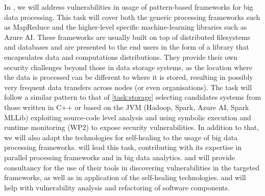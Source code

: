 \begin{Workpackage}{\thewpno}
 \begin{Task}
 \TaskResults{%
 \ref{del:bigdata1},
 \ref{del:bigdata2},
 \ref{del:bigdata3}
 }
 \TaskHeader{}
 In \theTask, we will address vulnerabilities in usage of pattern-based frameworks for big data processing. This task will cover both the generic processing frameworks such as MapReduce and the higher-level specific machine-learning libraries such as Azure AI. These frameworks are usually built on top of distributed filesystems and databases and are presented to the end users in the form of a library that encapsulates data and computations distributions. They provide their own security challenges beyond those in data storage systems, as the location where the data is processed can be different to where it is stored, resulting in possibly very frequent data transfers across nodes (or even organisations). The task will follow a similar pattern to that of \ref{task:storage} selecting candidates systems from those written in C++ or based on the JVM (Hadoop, Spark, Azure AI, Spark MLLib) exploiting source-code level analysis and using symbolic execution and runtime monitoring (WP2) to expose security vulnerabilities. In addition to that, we will also adapt the technologies for self-healing to the usage of big data processing frameworks. \UODshort{} will lead this task, contributing with its expertise in parallel processing frameworks and \SOPRAshort{} in big data analytics. \IBMshort{} and \YAGshort{} will provide consultancy for the use of their tools in discovering vulnerabilities in the targeted frameworks, as well as in application of the self-healing technologies. \UCM and \SA will help with vulnerability analysis and refactoring of software components.

\end{Task}
 
\begin{Task}
  

\end{Task}
\end{Workpackage}
